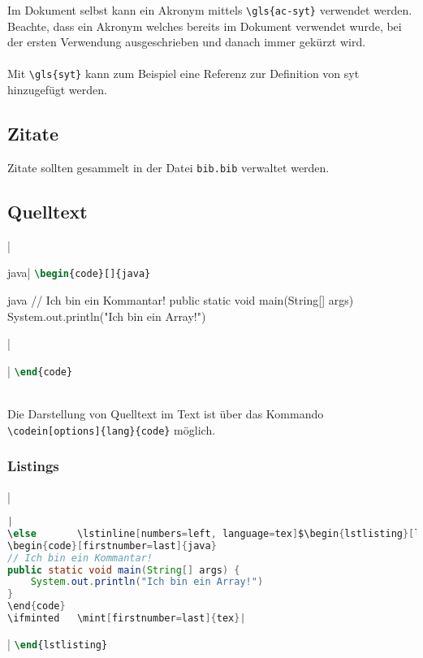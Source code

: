 Im Dokument selbst kann ein Akronym mittels \verb|\gls{ac-syt}| verwendet werden. Beachte, dass ein Akronym welches bereits im Dokument verwendet wurde, bei der ersten Verwendung ausgeschrieben und danach immer gekürzt wird.
\\\\
Mit \verb|\gls{syt}| kann zum Beispiel eine Referenz zur Definition von \gls{syt} hinzugefügt werden.

\subsection{Zitate}
Zitate sollten gesammelt in der Datei \texttt{bib.bib} verwaltet werden.

\newpage
\subsection{Quelltext}
\begin{listing}
\ifminted   {}|\begin{code}[]{java}|    %
\else       \lstinline[numbers=left, language=tex]$\begin{code}[]{java}$\fi
\begin{code}[firstnumber=last]{java}
// Ich bin ein Kommantar!
public static void main(String[] args) {
    System.out.println("Ich bin ein Array!")
}
\end{code}
\ifminted   {}|\end{code}|    %
\else       \lstinline[firstnumber=last, numbers=left, language=tex]$\end{code}$\fi

\caption{Java Code}
\label{lst:java-code}
\end{listing}
~\\
Die Darstellung von Quelltext im Text ist über das Kommando \verb|\codein[options]{lang}{code}| möglich.

\subsubsection{Listings}
\begin{listing}
\ifminted   {}|\begin{lstlisting}[language=Java, caption=Java Lstlisting]|
\else       \lstinline[numbers=left, language=tex]$\begin{lstlisting}[language=Java, caption=Java Lstlisting]$\fi
\begin{code}[firstnumber=last]{java}
// Ich bin ein Kommantar!
public static void main(String[] args) {
    System.out.println("Ich bin ein Array!")
}
\end{code}
\ifminted   \mint[firstnumber=last]{tex}|\end{lstlisting}|
\else       \lstinline[firstnumber=last, numbers=left, language=tex]$\end{lstlisting}$\fi
\caption{Java Lstlisting}
\label{lst:java-lstlisting}
\end{listing}

